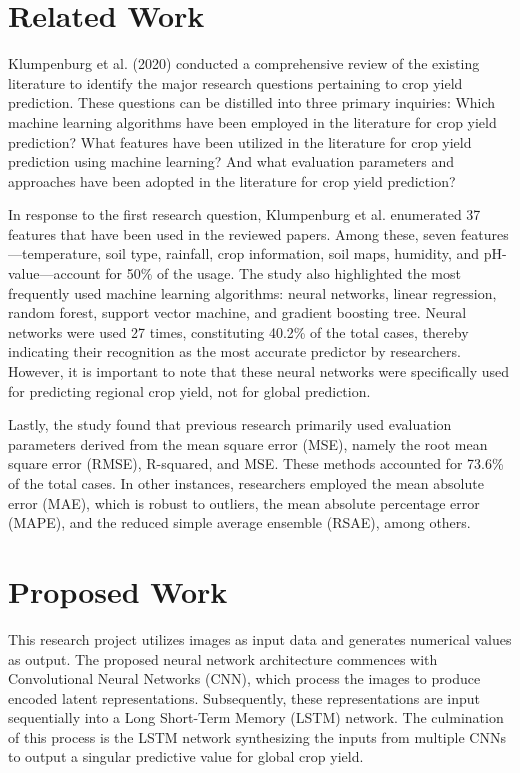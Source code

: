 \documentclass[11pt, oneside]{article}   	%
\begin{document}
\section*{Related Work}

Klumpenburg et al. (2020) \cite{citation_key3} conducted a comprehensive review of the existing literature to identify the major research questions pertaining to crop yield prediction. These questions can be distilled into three primary inquiries: Which machine learning algorithms have been employed in the literature for crop yield prediction? What features have been utilized in the literature for crop yield prediction using machine learning? And what evaluation parameters and approaches have been adopted in the literature for crop yield prediction?

In response to the first research question, Klumpenburg et al. enumerated 37 features that have been used in the reviewed papers. Among these, seven features—temperature, soil type, rainfall, crop information, soil maps, humidity, and pH-value—account for 50\% of the usage. The study also highlighted the most frequently used machine learning algorithms: neural networks, linear regression, random forest, support vector machine, and gradient boosting tree. Neural networks were used 27 times, constituting 40.2\% of the total cases, thereby indicating their recognition as the most accurate predictor by researchers. However, it is important to note that these neural networks were specifically used for predicting regional crop yield, not for global prediction.

Lastly, the study found that previous research primarily used evaluation parameters derived from the mean square error (MSE), namely the root mean square error (RMSE), R-squared, and MSE. These methods accounted for 73.6\% of the total cases. In other instances, researchers employed the mean absolute error (MAE), which is robust to outliers, the mean absolute percentage error (MAPE), and the reduced simple average ensemble (RSAE), among others.

\section*{Proposed Work}

This research project utilizes images as input data and generates numerical values as output. The proposed neural network architecture commences with Convolutional Neural Networks (CNN), which process the images to produce encoded latent representations. Subsequently, these representations are input sequentially into a Long Short-Term Memory (LSTM) network. The culmination of this process is the LSTM network synthesizing the inputs from multiple CNNs to output a singular predictive value for global crop yield.
\end{document}
